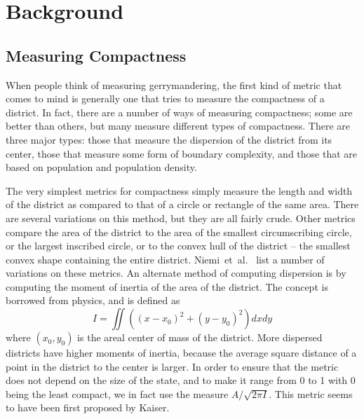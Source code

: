 \documentclass[12pt]{article}
\begin{document}
  \section{Background}\label{background}
  
  \subsection{Measuring Compactness}

  When people think of measuring gerrymandering, the first kind of metric that comes to mind is generally one that tries to measure the compactness of a district.  In fact, there are a number of ways of measuring compactness; some are better than others, but many measure different types of compactness.  There are three major types: those that measure the dispersion of the district from its center, those that measure some form of boundary complexity, and those that are based on population and population density.

  The very simplest metrics for compactness simply measure the length and width of the district as compared to that of a circle or rectangle of the same area.  There are several variations on this method, but they are all fairly crude.  Other metrics compare the area of the district to the area of the smallest circumscribing circle, or the largest inscribed circle, or to the convex hull of the district -- the smallest convex shape containing the entire district.  Niemi~et~al.~\cite{niemi} list a number of variations on these metrics.  An alternate method of computing dispersion is by computing the moment of inertia of the area of the district.  The concept is borrowed from physics, and is defined as
  \[I = \iint ((x-x_0)^2 + (y-y_0)^2) dx dy \]
  where $(x_0, y_0)$ is the areal center of mass of the district.  More dispersed districts have higher moments of inertia, because the average square distance of a point in the district to the center is larger.  In order to ensure that the metric does not depend on the size of the state, and to make it range from 0 to 1 with 0 being the least compact, we in fact use the measure $A/\sqrt{2\pi I}$.  This metric seems to have been first proposed by Kaiser.~\cite{kaiser}
\end{document}

